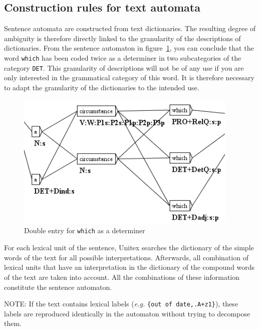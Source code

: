 \subsection{Construction rules for text automata}
Sentence automata are constructed from text dictionaries. The
resulting degree of ambiguity is therefore directly linked to the granularity of
the descriptions of dictionaries. From the sentence automaton
in figure~\ref{fig-ambiguity-of-which}, you can conclude that the word
\verb+which+ has been coded twice as a determiner in two subcategories of the
category \verb+DET+. This granularity of descriptions will not be of any use if
you are only interested in the grammatical category of this word. It is
therefore necessary to adapt the granularity of the dictionaries to the intended use.

\begin{figure}[!ht]
\begin{center}
\includegraphics[width=10.6cm]{resources/img/fig7-3.png}
\caption{Double entry for \texttt{which} as a
determiner\label{fig-ambiguity-of-which}}
\end{center}
\end{figure}

\bigskip
\noindent For each lexical unit of the sentence, Unitex searches the
dictionary of the simple words of the text for all possible interpretations. Afterwards,
all combination of lexical units that have an interpretation in the dictionary
of the compound words of the text are taken into account. All the combinations
of these information constitute the sentence automaton.

\bigskip
\noindent NOTE: If the text contains lexical labels (\textit{e.g.}
\verb${out of date,.A+z1}$), these labels are reproduced identically in the
automaton without trying to decompose them.

